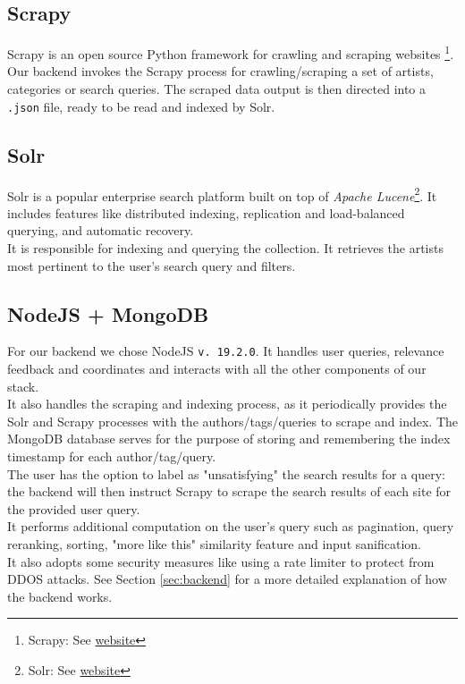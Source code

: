 \documentclass[tikz,14pt]{article}
\begin{document}
\subsection{Scrapy} \label{sec:scrapy}
Scrapy is an open source Python framework for crawling and scraping websites \footnote{Scrapy: See \href{https://scrapy.org}{website}}. Our backend invokes the Scrapy process for crawling/scraping a set of artists, categories or search queries. The scraped data output is then directed into a \verb|.json| file, ready to be read and indexed by Solr.

\subsection{Solr} \label{sec:solr}
Solr is a popular enterprise search platform built on top of \textit{Apache Lucene}\footnote{Solr: See \href{https://solr.apache.org/guide/solr/9_0/index.html}{website}}. It includes features like distributed indexing, replication and load-balanced querying, and automatic recovery.\\
It is responsible for indexing and querying the collection. It retrieves the artists most pertinent to the user's search query and filters.

\subsection{NodeJS + MongoDB} \label{sec:node-mongo}
For our backend we chose NodeJS \verb|v. 19.2.0|. It handles user queries, relevance feedback and coordinates and interacts with all the other components of our stack.\\
It also handles the scraping and indexing process, as it periodically provides the Solr and Scrapy processes with the authors/tags/queries to scrape and index. The MongoDB database serves for the purpose of storing and remembering the index timestamp for each author/tag/query.\\
The user has the option to label as "unsatisfying" the search results for a query: the backend will then instruct Scrapy to scrape the search results of each site for the provided user query.\\
It performs additional computation on the user's query such as pagination, query reranking, sorting, "more like this" similarity feature and input sanification.\\ It also adopts some security measures like using a rate limiter to protect from DDOS attacks. See Section \ref{sec:backend} for a more detailed explanation of how the backend works.
\end{document}
